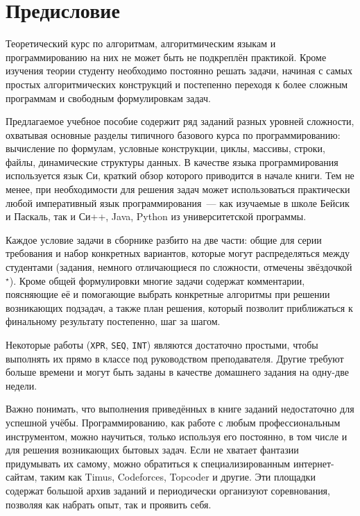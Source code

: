 \chapter{Предисловие}

Теоретический курс по алгоритмам, алгоритмическим языкам и программированию на них не может быть не
подкреплён практикой. Кроме изучения теории студенту необходимо постоянно решать задачи, начиная с
самых простых алгоритмических конструкций и постепенно переходя к более сложным программам
и свободным формулировкам задач.

Предлагаемое учебное пособие содержит ряд заданий разных уровней сложности, охватывая основные
разделы типичного базового курса по программированию: вычисление по формулам, условные конструкции,
циклы, массивы, строки, файлы, динамические структуры данных. В качестве языка программирования
используется язык Си, краткий обзор которого приводится в начале книги. Тем не менее, при
необходимости для решения задач может использоваться практически любой императивный язык
программирования~--- как изучаемые в школе Бейсик и Паскаль, так и Си++, Java, Python из
университетской программы.

Каждое условие задачи в сборнике разбито на две части: общие для серии требования и набор конкретных вариантов,
которые могут распределяться между студентами (задания, немного отличающиеся по сложности, отмечены
звёздочкой$^\star$). Кроме общей формулировки многие задачи содержат комментарии, поясняющие её и
помогающие выбрать конкретные алгоритмы при решении возникающих подзадач, а также план решения,
который позволит приближаться к финальному результату постепенно, шаг за шагом.

Некоторые работы (\texttt{XPR}, \texttt{SEQ}, \texttt{INT}) являются достаточно простыми, чтобы
выполнять их прямо в классе под руководством преподавателя. Другие требуют больше времени и могут
быть заданы в качестве домашнего задания на одну-две недели.

Важно понимать, что выполнения приведённых в книге заданий недостаточно для успешной учёбы.
Программированию, как работе с любым профессиональным инструментом, можно научиться, только
используя его постоянно, в том числе и для решения возникающих бытовых задач. Если не хватает
фантазии придумывать их самому, можно обратиться к специализированным интернет-сайтам, таким как
Timus, Codeforces, Topcoder и другие. Эти площадки содержат большой архив заданий и периодически
организуют соревнования, позволяя как набрать опыт, так и проявить себя.

